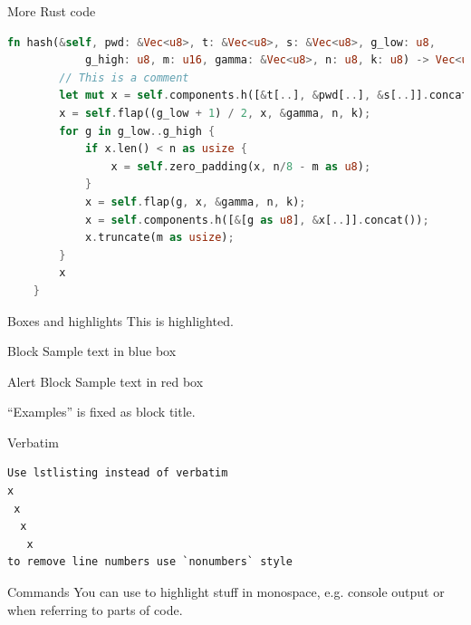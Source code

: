 \begin{frame}[fragile]{More Rust code}
  \begin{lstlisting}[autogobble, language=Rust]
    fn hash(&self, pwd: &Vec<u8>, t: &Vec<u8>, s: &Vec<u8>, g_low: u8,
            g_high: u8, m: u16, gamma: &Vec<u8>, n: u8, k: u8) -> Vec<u8> {
        // This is a comment
        let mut x = self.components.h([&t[..], &pwd[..], &s[..]].concat());
        x = self.flap((g_low + 1) / 2, x, &gamma, n, k);
        for g in g_low..g_high {
            if x.len() < n as usize {
                x = self.zero_padding(x, n/8 - m as u8);
            }
            x = self.flap(g, x, &gamma, n, k);
            x = self.components.h([&[g as u8], &x[..]].concat());
            x.truncate(m as usize);
        }
        x
    }
  \end{lstlisting}
\end{frame}

\begin{frame}{Boxes and highlights}
This is \alert{highlighted}.
\begin{block}{Block}
Sample text in blue box
\end{block}
\begin{alertblock}{Alert Block}
Sample text in red box
\end{alertblock}
\begin{examples}
``Examples'' is fixed as block title.
\end{examples}
\end{frame}

\begin{frame}[fragile]{Verbatim}
\begin{lstlisting}[style=nonumbers]
Use lstlisting instead of verbatim
x
 x
  x
   x
to remove line numbers use `nonumbers` style
\end{lstlisting}
\end{frame}

\begin{frame}{Commands}
  You can use  to highlight stuff in monospace, e.g.
  console output or when referring to parts of code.
\end{frame}

